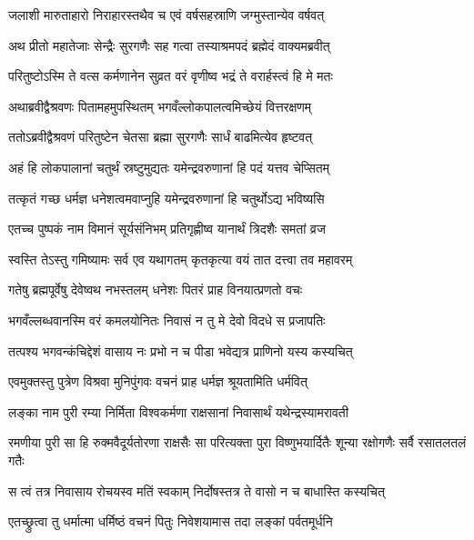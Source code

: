 \twolineshloka
{जलाशी मारुताहारो निराहारस्तथैव च}
{एवं वर्षसहस्राणि जग्मुस्तान्येव वर्षवत्} %

\twolineshloka
{अथ प्रीतो महातेजाः सेन्द्रैः सुरगणैः सह}
{गत्वा तस्याश्रमपदं ब्रह्मेदं वाक्यमब्रवीत्} %

\twolineshloka
{परितुष्टोऽस्मि ते वत्स कर्मणानेन सुव्रत}
{वरं वृणीष्व भद्रं ते वरार्हस्त्वं हि मे मतः} %

\twolineshloka
{अथाब्रवीद्वैश्रवणः पितामहमुपस्थितम्}
{भगवँल्लोकपालत्वमिच्छेयं वित्तरक्षणम्} %

\twolineshloka
{ततोऽब्रवीद्वैश्रवणं परितुष्टेन चेतसा}
{ब्रह्मा सुरगणैः सार्धं बाढमित्येव हृष्टवत्} %

\twolineshloka
{अहं हि लोकपालानां चतुर्थं स्रष्टुमुद्यतः}
{यमेन्द्रवरुणानां हि पदं यत्तव चेप्सितम्} %

\twolineshloka
{तत्कृतं गच्छ धर्मज्ञ धनेशत्वमवाप्नुहि}
{यमेन्द्रवरुणानां हि चतुर्थोऽद्य भविष्यसि} %

\twolineshloka
{एतच्च पुष्पकं नाम विमानं सूर्यसंनिभम्}
{प्रतिगृह्णीष्व यानार्थं त्रिदशैः समतां व्रज} %

\twolineshloka
{स्वस्ति तेऽस्तु गमिष्यामः सर्व एव यथागतम्}
{कृतकृत्या वयं तात दत्त्वा तव महावरम्} %

\twolineshloka
{गतेषु ब्रह्मपूर्वेषु देवेष्वथ नभस्तलम्}
{धनेशः पितरं प्राह विनयात्प्रणतो वचः} %

\twolineshloka
{भगवँल्लब्धवानस्मि वरं कमलयोनितः}
{निवासं न तु मे देवो विदधे स प्रजापतिः} %

\twolineshloka
{तत्पश्य भगवन्कंचिद्देशं वासाय नः प्रभो}
{न च पीडा भवेद्यत्र प्राणिनो यस्य कस्यचित्} %

\twolineshloka
{एवमुक्तस्तु पुत्रेण विश्रवा मुनिपुंगवः}
{वचनं प्राह धर्मज्ञ श्रूयतामिति धर्मवित्} %

\twolineshloka
{लङ्का नाम पुरी रम्या निर्मिता विश्वकर्मणा}
{राक्षसानां निवासार्थं यथेन्द्रस्यामरावती} %

\threelineshloka
{रमणीया पुरी सा हि रुक्मवैदूर्यतोरणा}
{राक्षसैः सा परित्यक्ता पुरा विष्णुभयार्दितैः}
{शून्या रक्षोगणैः सर्वै रसातलतलं गतैः} %

\twolineshloka
{स त्वं तत्र निवासाय रोचयस्व मतिं स्वकाम्}
{निर्दोषस्तत्र ते वासो न च बाधास्ति कस्यचित्} %

\twolineshloka
{एतच्छ्रुत्वा तु धर्मात्मा धर्मिष्ठं वचनं पितुः}
{निवेशयामास तदा लङ्कां पर्वतमूर्धनि} %

